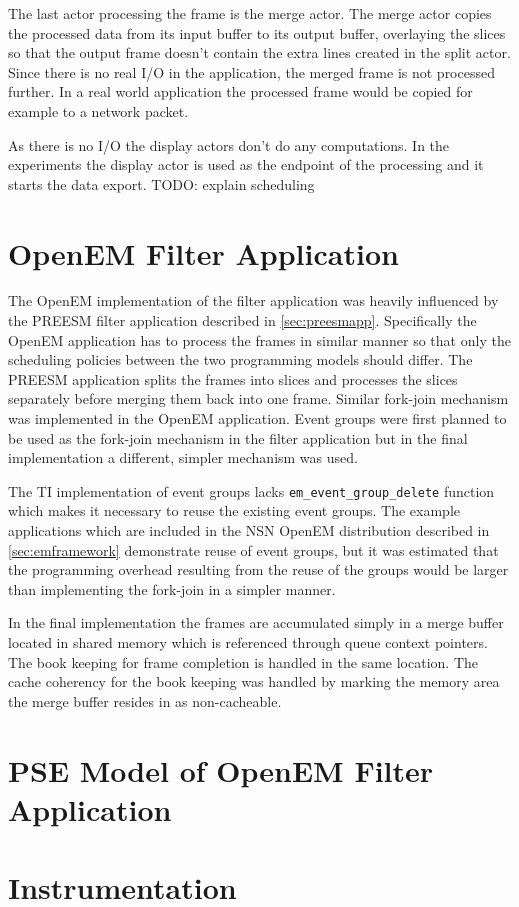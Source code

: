 The last actor processing the frame is the merge actor. The merge actor copies
the processed data from its input buffer to its output buffer, overlaying the
slices so that the output frame doesn't contain the extra lines created in the
split actor. Since there is no real I/O in the application, the merged frame is
not processed further. In a real world application the processed frame would be
copied for example to a network packet.

As there is no I/O the display actors don't do any computations. In the
experiments the display actor is used as the endpoint of the processing and it
starts the data export.
TODO: explain scheduling

\section{OpenEM Filter Application}
The OpenEM implementation of the filter application was heavily influenced by
the PREESM filter application described in \ref{sec:preesmapp}. Specifically the
OpenEM application has to process the frames in similar manner so that only the
scheduling policies between the two programming models should differ. The PREESM
application splits the frames into slices and processes the slices separately
before merging them back into one frame. Similar fork-join mechanism was
implemented in the OpenEM application. Event groups were first planned to be
used as the fork-join mechanism in the filter application but in the final
implementation a different, simpler mechanism was used.

The TI implementation of event groups lacks \texttt{em\_event\_group\_delete}
function which makes it necessary to reuse the existing event groups. The
example applications which are included in the NSN OpenEM distribution
described in \ref{sec:emframework} demonstrate reuse of event groups, but it
was estimated that the programming overhead resulting from the reuse of the
groups would be larger than implementing the fork-join in a simpler manner.

In the final implementation the frames are accumulated simply in a merge buffer
located in shared memory which is referenced through queue context pointers. The
book keeping for frame completion is handled in the same location. The cache
coherency for the book keeping was handled by marking the memory area the merge
buffer resides in as non-cacheable.

\section{PSE Model of OpenEM Filter Application}
\section{Instrumentation}
